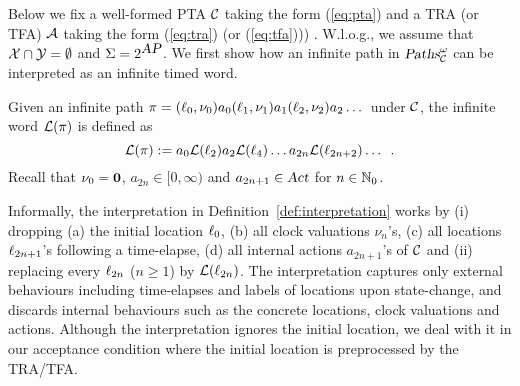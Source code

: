 Below we fix a well-formed PTA $\mathcal{C}$ taking the form (\ref{eq:pta}) and a TRA (or TFA) $\mathcal{A}$ taking the form (\ref{eq:tra}) (or (\ref{eq:tfa}))) .
W.l.o.g., we assume that $\mathcal{X}\cap\mathcal{Y}=\emptyset$ and $\Sigma=2^{\mbox{\sl AP}}$.
We first show how an infinite path in $\mbox{\sl Paths}^\omega_{\mathcal{C}}$ can be interpreted as an infinite timed word.
%
\begin{definition}\label{def:interpretation}
Given an infinite path
$
    \pi
        =
            (\ell_0,\nu_0)
            a_0
            (\ell_1,\nu_1)
            a_1
            (\ell_2,\nu_2)a_2
            \dots
$
under $\mathcal{C}$, the infinite word $\mathcal{L}(\pi)$
is defined as
\[
\mathcal{L}(\pi):=a_0\mathcal{L}(\ell_2)a_2\mathcal{L}(\ell_4)\dots a_{2n}\mathcal{L}(\ell_{2n+2}) \dots\enskip.
\]
Recall that $\nu_0=\mathbf{0}$, $a_{2n}\in [0,\infty)$ and $a_{2n+1}\in\mbox{\sl Act}$ for $n\in\mathbb{N}_0$.
\end{definition}
%
\begin{remark}
Informally, the interpretation in Definition~\ref{def:interpretation} works
by (i) dropping (a) the initial location $\ell_0$, (b) all clock valuations $\nu_n$'s,
(c) all locations $\ell_{2n+1}$'s following a time-elapse,
(d) all internal actions $a_{2n+1}$'s of $\mathcal{C}$ and (ii) replacing every $\ell_{2n}$ ($n\ge 1$) by $\mathcal{L}(\ell_{2n})$.
The interpretation captures only external behaviours including time-elapses and labels of locations upon state-change, and discards internal behaviours such as the concrete locations, clock valuations and actions.
Although the interpretation ignores the initial location,
we deal with it in our acceptance condition where the initial location is preprocessed by the TRA/TFA.
\end{remark}
%

